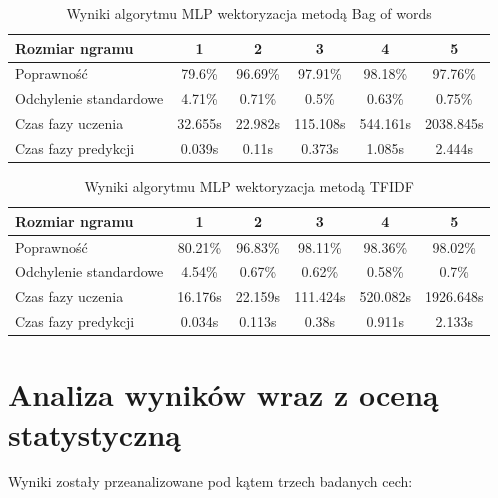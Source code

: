 \begin{table}[H]
    \centering
    \caption{Wyniki algorytmu MLP wektoryzacja metodą Bag of words}
    \begin{tabular}{ | l | c | c | c | c | c |}
        \hline
        Rozmiar ngramu & 1 & 2 & 3 & 4 & 5  \\ \hline
        Poprawność & 79.6\% & 96.69\% & 97.91\% & 98.18\% & 97.76\%   \\ \hline
        Odchylenie standardowe & 4.71\% & 0.71\% & 0.5\% & 0.63\% & 0.75\%  \\ \hline
        Czas fazy uczenia & 32.655s & 22.982s & 115.108s & 544.161s & 2038.845s  \\ \hline
        Czas fazy predykcji & 0.039s & 0.11s & 0.373s & 1.085s & 2.444s  \\ \hline
    \end{tabular}
\end{table}

\begin{table}[H]
    \centering
    \caption{Wyniki algorytmu MLP wektoryzacja metodą TFIDF}
    \begin{tabular}{ | l | c | c | c | c | c |}
        \hline
        Rozmiar ngramu & 1 & 2 & 3 & 4 & 5   \\ \hline
        Poprawność & 80.21\% & 96.83\% & 98.11\% & 98.36\% & 98.02\%   \\ \hline
        Odchylenie standardowe & 4.54\% & 0.67\% & 0.62\% & 0.58\% & 0.7\%  \\ \hline
        Czas fazy uczenia & 16.176s & 22.159s & 111.424s & 520.082s & 1926.648s  \\ \hline
        Czas fazy predykcji & 0.034s & 0.113s & 0.38s & 0.911s & 2.133s  \\ \hline
    \end{tabular}
\end{table}
\section{Analiza wyników wraz z oceną statystyczną}


Wyniki zostały przeanalizowane pod kątem trzech badanych cech:

